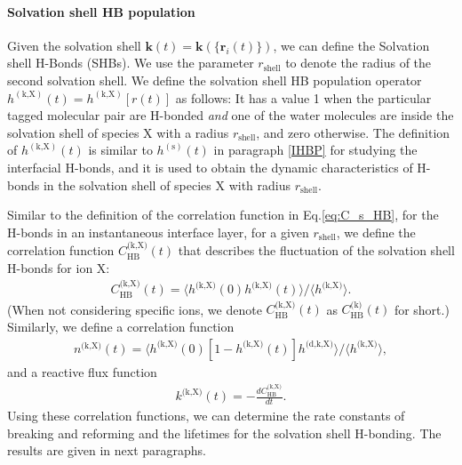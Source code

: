 \paragraph{Solvation shell HB population}\label{para:SHBP}
Given the solvation shell ${\mathbf k}(t)={\mathbf k}(\{{\mathbf r}_i(t)\})$, we can define the Solvation shell H-Bonds (SHBs).
We use the parameter $r_\text{shell}$ to denote the radius of the second solvation shell.
We define the solvation shell HB population operator $h^{(\text{k,X})}(t) = h^{(\text{k,X})}[{r}(t)]$ as follows:
It has a value 1 when the particular tagged molecular pair are H-bonded \emph{and} one of the water molecules are inside the solvation shell of species X
with a radius $r_\text{shell}$, and zero otherwise. 
The definition of $h^{(\text{k,X})}(t)$ is similar to $h^{(\text{s})}(t)$ in paragraph \ref{IHBP} for studying the interfacial H-bonds, and it is used to obtain the dynamic characteristics of H-bonds in the solvation shell of species X with radius $r_\text{shell}$. 

Similar to the definition of the correlation function \CSHB in Eq.\thinspace\ref{eq:C_s_HB}, for the H-bonds in an instantaneous interface layer, 
for a given $r_\text{shell}$, we define the correlation function $C^\text{(k,X)}_\text{HB}(t)$ that describes the fluctuation of the solvation shell H-bonds for ion X: 
\begin{eqnarray}
C^\text{(k,X)}_{\text{HB}}(t)=\langle h^\text{(k,X)}(0)h^\text{(k,X)}(t) \rangle/\langle h^\text{(k,X)}\rangle
\label{eq:C_k_HB}.
\end{eqnarray}
(When not considering specific ions, we denote $C^\text{(k,X)}_{\text{HB}}(t)$ as $C^{\text{(k)}}_\text{HB}(t)$ for short.)
%
Similarly, we define a correlation function 
\begin{eqnarray}
n^\text{(k,X)}(t)=\langle h^\text{(k,X)}(0)[1-h^\text{(k,X)}(t)]h^\text{(d,k,X)} \rangle/\langle h^\text{(k,X)}\rangle
\label{eq:n_k_HB},
\end{eqnarray}
and a reactive flux function
\begin{eqnarray}
k^\text{(k,X)}(t)= -\frac{dC_\text{HB}^\text{(k,X)}}{dt}
\label{eq:k_k_HB}.
\end{eqnarray}
Using these correlation functions, we can determine the rate constants of breaking and reforming and the lifetimes for the solvation shell H-bonding.
The results are given in next paragraphs.
%
